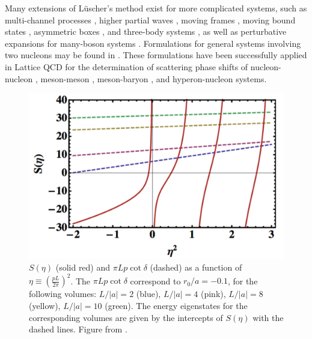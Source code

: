 Many extensions of L\"uscher's method exist for more complicated systems, such as multi-channel processes \cite{Briceno:2012yi,Hansen:2012tf,Li:2014wga,Briceno:2014oea,Briceno:2015tza,Briceno:2015csa,Briceno:2015axa,Briceno:2014uqa}, higher partial waves \cite{Luu:2011ep,Konig:2011nz,Koenig:2011ti}, moving frames \cite{Rummukainen:1995vs,Kim:2005gf}, moving bound states \cite{Bour:2011ef,Davoudi:2011md}, asymmetric boxes \cite{Li:2003jn,Feng:2004ua}, and three-body systems \cite{Hansen:2016fzj,Hansen:2015zga,Hansen:2014eka,Briceno:2012rv}, as well as perturbative expansions for many-boson systems \cite{Beane:2007qr,Detmold:2008gh,Smigielski:2008pa}. Formulations for general systems involving two nucleons may be found in \cite{Briceno:2013lba,Briceno:2013bda}. These formulations have been successfully applied in Lattice QCD for the determination of scattering phase shifts of nucleon-nucleon \cite{Beane:2006mx,Beane:2011iw,Beane:2012vq,Detmold:2015daa,Beane:2015yha,Chang:2015qxa,Orginos:2015aya,Yamazaki:2012hi,Yamazaki:2015asa,Berkowitz:2015eaa,Murano:2013xxa}, meson-meson \cite{Wilson:2014cna,Wilson:2015dqa,Dudek:2012gj,Dudek:2012xn,Dudek:2014qha,Beane:2011sc,Aoki:2007rd,Aoki:2011yj,Pelissier:2012pi,Feng:2010es,Torres:2014vna,Bolton:2015psa,Briceno:2015dca,Lang:2012sv,Prelovsek:2013ela,Lang:2014yfa,Lang:2015hza,Lang:2011mn,Briceno:2016kkp}, meson-baryon \cite{Verduci:2014csa,Lang:2012db,Torok:2009dg,Detmold:2015qwf}, and hyperon-nucleon \cite{Beane:2012ey,Beane:2009py,Beane:2006gf} systems.

\begin{figure}
\begin{center}
\includegraphics[width=0.5\linewidth]{Chapter5-figures/luscher}
\end{center}
\caption{\label{fig:luscher}$S(\eta)$ (solid red) and $\pi L p \cot \delta$ (dashed) as a function of $\eta \equiv \left(\frac{p L}{2\pi}\right)^2$. The $\pi L p \cot \delta$ correspond to $r_0/a=-0.1$, for the following volumes: $L/|a|=2$ (blue), $L/|a|=4$ (pink), $L/|a|=8$ (yellow), $L/|a|=10$ (green).  The energy eigenstates for the corresponding volumes are given by the intercepts of $S(\eta)$ with the dashed lines. Figure from \cite{Drut:2012md}.}
\end{figure}

